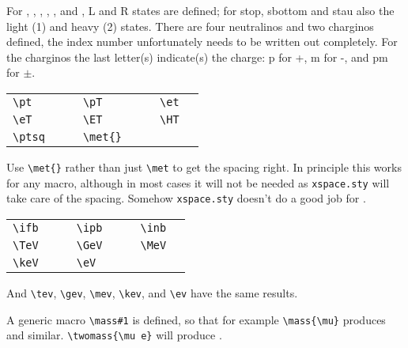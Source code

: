 \documentclass{style/atlasdoc}
\begin{document}
\medskip

\noindent For , , , \slepton, \sel, \smu and
\stau, L and R states are defined; for stop, sbottom and stau also the
light (1) and heavy (2) states. There are four neutralinos and two
charginos defined, the index number unfortunately needs to be written
out completely. For the charginos the last letter(s) indicate(s) the
charge: p for +, m for -, and pm for $\pm$.

\medskip

\begin{tabular}{llcllcll}
  \verb+\pt+ & \pt{} & \hspace{1cm} &
  \verb+\pT+ & \pT{} & \hspace{1cm} &
  \verb+\et+ & \et{} \\
  \verb+\eT+ & \eT{} & &
  \verb+\ET+ & \ET{} & &
  \verb+\HT+ & \HT{} \\
  \verb+\ptsq+ & \ptsq{} & &
  \verb+\met{}+ & \met{} & &
\end{tabular}

\medskip

\noindent Use \verb+\met{}+ rather than just \verb+\met+ to get the spacing
right. In principle this works for any macro, although in most cases it will
not be needed as {\tt xspace.sty} will take care of the spacing. Somehow
{\tt xspace.sty} doesn't do a good job for \met.

\vspace{5mm}

\begin{tabular}{llcllcll}
\verb+\ifb+ & \ifb{} & \hspace{1cm} &
\verb+\ipb+ & \ipb{} & \hspace{1cm} &
\verb+\inb+ & \inb{} \\
\verb+\TeV+ & \TeV{} & &
\verb+\GeV+ & \GeV{} & &
\verb+\MeV+ & \MeV{} \\
\verb+\keV+ & \keV{} & &
\verb+\eV+ & \eV{} & & & \\
\end{tabular}

\medskip

\noindent And \verb+\tev+, \verb+\gev+, \verb+\mev+, \verb+\kev+, and
\verb+\ev+ have the same results.

\medskip

\noindent A generic macro \verb+\mass#1+ is defined, so that for example
\verb+\mass{\mu}+ produces \mass{\mu} and similar.
\verb+\twomass{\mu e}+ will produce .


\end{document}
